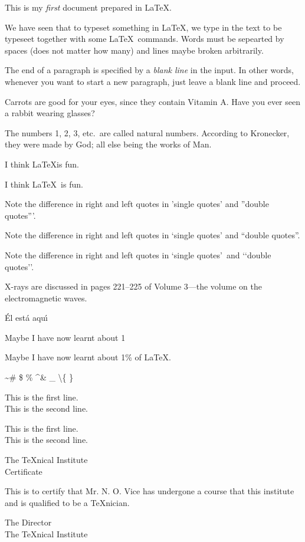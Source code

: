 \documentclass{article}
\begin{document}
This is my \emph{first} document prepared in \LaTeX.

\noindent We have seen that to typeset something in \LaTeX, we type in the text to be typeseet together with some \LaTeX\ commands. Words must be sepearted by
spaces (does not matter how many) and lines maybe broken arbitrarily.

\noindent The end of a paragraph is specified by a \emph{blank line} in the input. In other words, whenever you want to start a new paragraph, just leave a blank
line and proceed.

\noindent Carrots are good for your eyes, since they contain Vitamin A\@. Have you ever seen a rabbit wearing glasses?

\noindent The numbers 1, 2, 3, etc.\ are called natural numbers. According to Kronecker, they were made by God; all else being the works of Man.

\noindent I think \LaTeX is fun.

\noindent I think \LaTeX\ is fun.

Note the difference in right and left quotes in 'single quotes' and ''double quotes'''.

Note the difference in right and left quotes in `single quotes' and 	``double quotes''.

Note the difference in right and left quotes in \lq single quotes\rq\ and \lq\lq double quotes\rq\rq.

X-rays are discussed in pages 221--225 of Volume 3---the volume on the electromagnetic waves.

\'{E}l est\'{a} aqu\'{\i}

Maybe I have now learnt about 1%


Maybe I have now learnt about 1\% of \LaTeX.

\textasciitilde \#  \$  \% \textasciicircum \& \_ \textbackslash \{ \} 

\noindent This is the first line. \\ This is the second line.

\noindent This is the first line.\\ [10pt] This is the second line.

\begin{center}
The \TeX nical Institute \\[.75cm]
Certificate
\end{center}
\noindent This is to certify that Mr. N. O. Vice has undergone a course that this institute and is qualified to be a \TeX nician.
\begin{flushright}
The Director\\ The \TeX nical Institute
\end{flushright}
\end{document}
